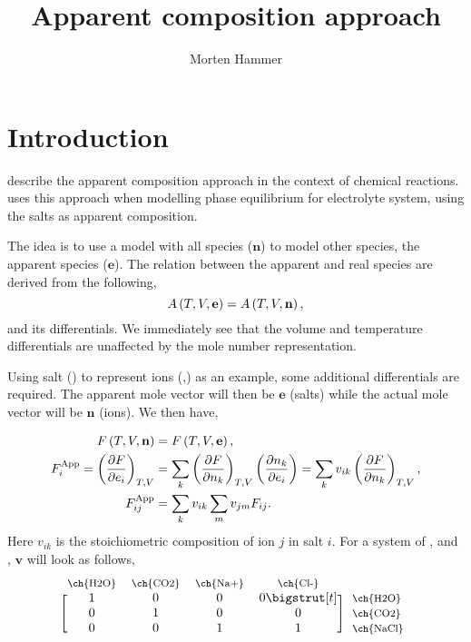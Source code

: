 \documentclass[english]{../thermomemo/thermomemo}
\title{Apparent composition approach}
\author{Morten Hammer}
\newcommand*{\pder}[2]{\left(\frac{\partial #1}{\partial #2}\right)}
\newcommand*{\pdersub}[3]{\left(\frac{\partial #1}{\partial #2}\right)_{#3}}
\newcommand*{\vektor}[1]{\boldsymbol{#1}}%
\newcommand{\lp}{\ensuremath{\left(}\xspace}
\newcommand{\rp}{\ensuremath{\right)}\xspace}
\newcommand{\mbn}[0]{\mathbf n}
\newcommand{\mbe}[0]{\mathbf e}
\newcommand{\app}{\ensuremath{\text{App}}\xspace}
\begin{document}
\frontmatter
\tableofcontents
\section{Introduction}
\citet[Chap. 13, Sec. 7]{Michelsen2007} describe the apparent
composition approach in the context of chemical
reactions. \citet[App. C.3]{Mogensen2014} uses this approach when
modelling phase equilibrium for electrolyte system, using the salts as
apparent composition.

The idea is to use a model with all species ($\vektor{n}$) to model
other species, the apparent species ($\vektor{e}$). The relation
between the apparent and real species are derived from the following,
\begin{equation}
  A\lp T, V, \mbe \rp = A\lp T, V, \mbn \rp,
\label{eq:helmholtz}
\end{equation}
and its differentials. We immediately see that the volume and
temperature differentials are unaffected by the mole number
representation.

Using salt () to represent ions (,) as an
example, some additional differentials are required. The apparent mole
vector will then be $\mbe$ (salts) while the actual mole vector will
be $\mbn$ (ions). We then have,

\begin{align}
  F\lp T, V, \mbn \rp &= F\lp T, V, \mbe \rp,\\
  F_i^\app = \pdersub{F}{e_i}{T,V} &=
  \sum_k\pdersub{F}{n_k}{T,V}\pder{n_k}{e_i}
  = \sum_k v_{ik} \pdersub{F}{n_k}{T,V},\\
  F_{ij}^\app &
  = \sum_k v_{ik} \sum_m v_{jm} F_{ij}.
\end{align}
Here $v_{ik}$ is the stoichiometric composition of ion $j$ in salt
$i$. For a system of ,  and , $\mathbf{v}$
will look as follows,
\begin{equation}
  \begin{blockarray}{*{4}{c} l}
    \begin{block}{*{4}{>{$\footnotesize}c<{$}} l}
      \ch{H2O} & \ch{CO2} & \ch{Na+} & \ch{Cl-} & \\
    \end{block}
    \begin{block}{[*{4}{c}]>{$\footnotesize}l<{$}}
      1 & 0 & 0 & 0  \bigstrut[t] & \ch{H2O} \\
      0 & 1 & 0 & 0 & \ch{CO2} \\
      0 & 0 & 1 & 1 & \ch{NaCl} \\
    \end{block}
  \end{blockarray}
\end{equation}
\end{document}
